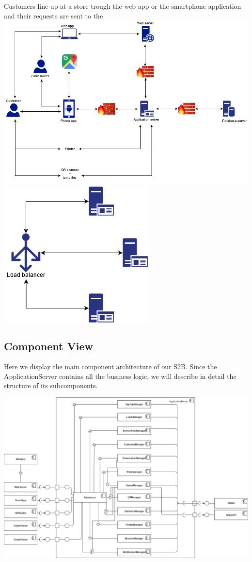 Customers line up at a store trough the web app or the smartphone application and their requests are sent to the 
\newpage
\includegraphics[scale=0.5]{Images/System Architecture.png}\\
\includegraphics[scale=0.5]{Images/LoadBalancer.png}\\

\subsection{Component View}
Here we display the main component architecture of our S2B. Since the ApplicationServer contains all the business logic, we will describe in detail the structure of its subcomponents.
\begin{flushleft}
\includegraphics[scale=0.4]{Images/Component.png}
\end{flushleft}
